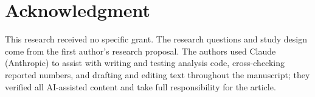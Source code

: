 \documentclass[journal]{IEEEtran}
\begin{document}
\section*{Acknowledgment}
This research received no specific grant. The research questions and study design come from the first author's research proposal. The authors used Claude (Anthropic) to assist with writing and testing analysis code, cross-checking reported numbers, and drafting and editing text throughout the manuscript; they verified all AI-assisted content and take full responsibility for the article.



\end{document}
